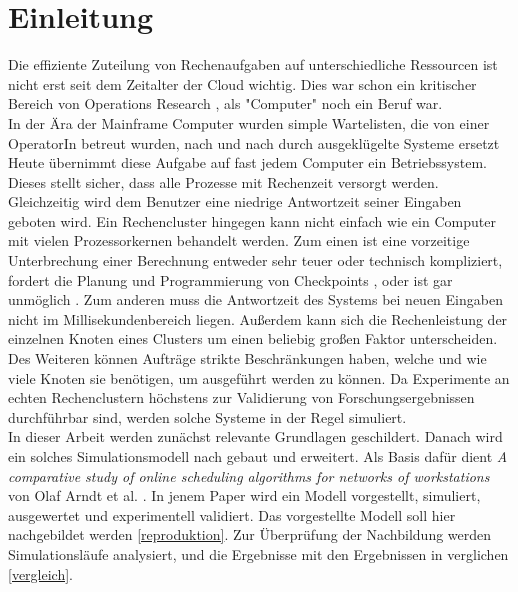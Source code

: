 \chapter{Einleitung}
\label{chap:ein}


Die effiziente Zuteilung von Rechenaufgaben auf unterschiedliche Ressourcen ist nicht erst seit dem Zeitalter der Cloud wichtig. Dies war schon ein kritischer Bereich von Operations Research
, als "Computer" noch ein Beruf war.\\

In der Ära der Mainframe Computer wurden simple Wartelisten, die von einer OperatorIn betreut wurden, nach und nach durch ausgeklügelte Systeme ersetzt %
Heute übernimmt diese Aufgabe auf fast jedem Computer ein Betriebssystem. Dieses stellt sicher, dass alle Prozesse mit Rechenzeit versorgt werden. Gleichzeitig wird dem Benutzer eine niedrige Antwortzeit seiner Eingaben geboten wird. Ein Rechencluster hingegen kann nicht einfach wie ein Computer mit vielen Prozessorkernen behandelt werden. Zum einen ist eine vorzeitige Unterbrechung einer Berechnung entweder sehr teuer oder technisch kompliziert, fordert die Planung und Programmierung von Checkpoints \cite{IPS15}, oder ist gar unmöglich \cite{adams1979hitchhiker}.
Zum anderen muss die Antwortzeit des Systems bei neuen Eingaben nicht im Millisekundenbereich liegen.
Außerdem kann sich die Rechenleistung der einzelnen Knoten eines Clusters um einen beliebig großen Faktor unterscheiden.
Des Weiteren können Aufträge strikte Beschränkungen haben, welche und  wie viele Knoten sie benötigen, um ausgeführt werden zu können.
Da Experimente an echten Rechenclustern höchstens zur Validierung von Forschungsergebnissen durchführbar sind, werden solche Systeme in der Regel simuliert.\\
In dieser Arbeit werden zunächst relevante Grundlagen geschildert.
Danach wird ein solches Simulationsmodell nach gebaut und erweitert. Als Basis dafür dient \emph{A comparative study of online scheduling algorithms for networks of workstations} von Olaf Arndt et al. \cite{Arn99}. In jenem Paper wird ein Modell vorgestellt, simuliert, ausgewertet und experimentell validiert. Das vorgestellte Modell soll hier nachgebildet werden \ref{reproduktion}. Zur Überprüfung der Nachbildung werden Simulationsläufe analysiert, und die Ergebnisse mit den Ergebnissen in \cite{Arn99} verglichen \ref{vergleich}.\\
